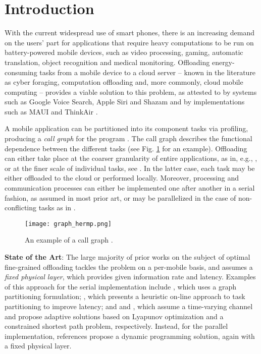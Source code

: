\documentclass[journal,twocolumn,10pt,twoside]{IEEEtranTCOM}
\theoremstyle{plain}
\theoremstyle{plain}
\theoremstyle{remark}
\begin{document}
\section{Introduction}
\label{sec:intro}
With the current widespread use of smart phones, there is an increasing
demand on the users' part for applications that require heavy computations
to be run on battery-powered mobile devices, such as video processing,
gaming, automatic translation, object recognition and medical monitoring. Offloading energy-consuming tasks from a mobile
device to a cloud server -- known in the literature as cyber foraging, computation offloading \cite{kumar} and, more commonly, cloud mobile
computing \cite{fern} -- provides a viable solution to this problem, as attested to by systems such as Google Voice Search, Apple Siri and
Shazam and by implementations such as MAUI \cite{maui} and ThinkAir \cite{kosta}.

A mobile application can be partitioned into its component tasks via
profiling, producing a \emph{call graph }for the program \cite{cal}. The call graph describes the functional dependence between the different tasks (see Fig. \ref{graph2} for an example). Offloading can either take place at the coarser
granularity of entire applications, as in, e.g., \cite{sat}, or at the finer scale of individual tasks, see \cite{maui}. In the latter case, each task may be either offloaded to the cloud
or performed locally. Moreover, processing and communication processes can either be implemented one after another in a serial fashion, as assumed in most prior art, or may be parallelized in the case of non-conflicting tasks as in \cite{no}\cite{hermp}.

\begin{figure}
\centering
\texttt{[image: graph\_hermp.png]}
\caption{An example of a call graph  \cite{hermp}.}\label{graph2}\vspace{-1.5em}
\end{figure}
\textbf{State of the Art}: The large majority of prior works on the subject of optimal fine-grained
offloading tackles the problem on a per-mobile basis, and assumes a \emph{fixed physical layer}, which provides given
information rate and latency. Examples of this approach for the serial implementation include \cite{yang}, which uses a graph
partitioning formulation; \cite{odessa}, which presents a heuristic on-line approach to task
partitioning to improve latency; and \cite{sub} and \cite{cll}, which assume a time-varying channel and propose
adaptive solutions based on Lyapunov optimization and a constrained
shortest path problem, respectively. Instead, for the parallel implementation, references \cite{no}\cite{hermp} propose a dynamic programming solution, again with a fixed physical layer.
\end{document}

